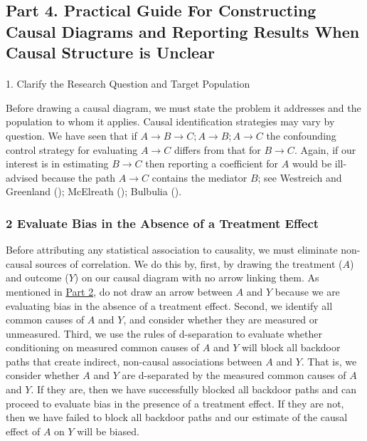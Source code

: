 \documentclass[
  singlecolumn]{article}
\makeatletter
\let\oldparagraph\paragraph
\renewcommand{\paragraph}{
    \@ifstar
      \xxxParagraphStar
      \xxxParagraphNoStar
  }
\newcommand{\xxxParagraphStar}[1]{\oldparagraph*{#1}\mbox{}}
\newcommand{\xxxParagraphNoStar}[1]{\oldparagraph{#1}\mbox{}}
\makeatother
\begin{document}
\subsection{Part 4. Practical Guide For Constructing Causal Diagrams and
Reporting Results When Causal Structure is Unclear}\label{section-part4}

\paragraph{1. Clarify the Research Question and Target
Population}\label{clarify-the-research-question-and-target-population}

Before drawing a causal diagram, we must state the problem it addresses
and the population to whom it applies. Causal identification strategies
may vary by question. We have seen that if
\(A\to B\to C; A\to B; A\to C\) the confounding control strategy for
evaluating \(A \to C\) differs from that for \(B \to C\). Again, if our
interest is in estimating \(B \to C\) then reporting a coefficient for
\(A\) would be ill-advised because the path \(A\to C\) contains the
mediator \(B\); see Westreich and Greenland
(); McElreath
(); Bulbulia
().

\subsubsection{2 Evaluate Bias in the Absence of a Treatment
Effect}\label{evaluate-bias-in-the-absence-of-a-treatment-effect}

Before attributing any statistical association to causality, we must
eliminate non-causal sources of correlation. We do this by, first, by
drawing the treatment (\(A\)) and outcome (\(Y\)) on our causal diagram
with no arrow linking them. As mentioned in
\hyperref[section-part2]{Part 2}, do not draw an arrow between \(A\) and
\(Y\) because we are evaluating bias in the absence of a treatment
effect. Second, we identify all common causes of \(A\) and \(Y\), and
consider whether they are measured or unmeasured. Third, we use the
rules of d-separation to evaluate whether conditioning on measured
common causes of \(A\) and \(Y\) will block all backdoor paths that
create indirect, non-causal associations between \(A\) and \(Y\). That
is, we consider whether \(A\) and \(Y\) are d-separated by the measured
common causes of \(A\) and \(Y\). If they are, then we have successfully
blocked all backdoor paths and can proceed to evaluate bias in the
presence of a treatment effect. If they are not, then we have failed to
block all backdoor paths and our estimate of the causal effect of \(A\)
on \(Y\) will be biased.
\end{document}
